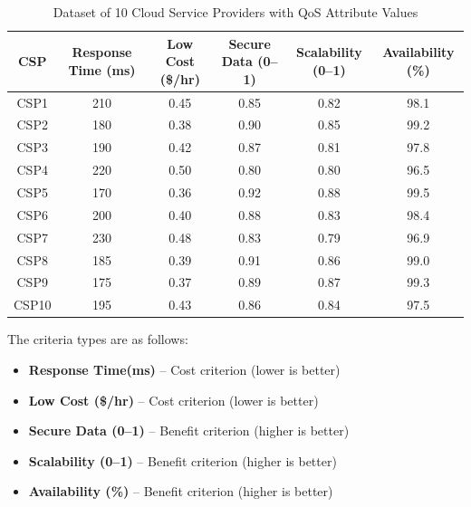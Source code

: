 \documentclass[twocolumn]{svjour3}
\begin{document}
\begin{table}[t]
\centering
\caption{Dataset of 10 Cloud Service Providers with QoS Attribute Values}
\label{tab:dataset}
\begin{tabular}{|c|c|c|c|c|c|}
\hline
\textbf{CSP} & \textbf{Response Time (ms)} & \textbf{Low Cost (\$/hr)} & \textbf{Secure Data (0--1)} & \textbf{Scalability (0--1)} & \textbf{Availability (\%)} \\
\hline
CSP1  & 210 & 0.45 & 0.85 & 0.82 & 98.1 \\
CSP2  & 180 & 0.38 & 0.90 & 0.85 & 99.2 \\
CSP3  & 190 & 0.42 & 0.87 & 0.81 & 97.8 \\
CSP4  & 220 & 0.50 & 0.80 & 0.80 & 96.5 \\
CSP5  & 170 & 0.36 & 0.92 & 0.88 & 99.5 \\
CSP6  & 200 & 0.40 & 0.88 & 0.83 & 98.4 \\
CSP7  & 230 & 0.48 & 0.83 & 0.79 & 96.9 \\
CSP8  & 185 & 0.39 & 0.91 & 0.86 & 99.0 \\
CSP9  & 175 & 0.37 & 0.89 & 0.87 & 99.3 \\
CSP10 & 195 & 0.43 & 0.86 & 0.84 & 97.5 \\
\hline
\end{tabular}
\end{table}

\begin{table}[t]
\centering
\caption{House of Quality (HoQ): Relationship Matrix Between Functional Requirements and QoS Attributes}
\label{tab:hoq_matrix}
\end{table}


The criteria types are as follows:
\begin{itemize}
    \item \textbf{Response Time(ms)} – Cost criterion (lower is better)
    \item \textbf{Low Cost (\$/hr)} – Cost criterion (lower is better)
    \item \textbf{Secure Data (0--1)} – Benefit criterion (higher is better)
    \item \textbf{Scalability (0--1)} – Benefit criterion (higher is better)
    \item \textbf{Availability (\%)} – Benefit criterion (higher is better)
\end{itemize}
\end{document}
